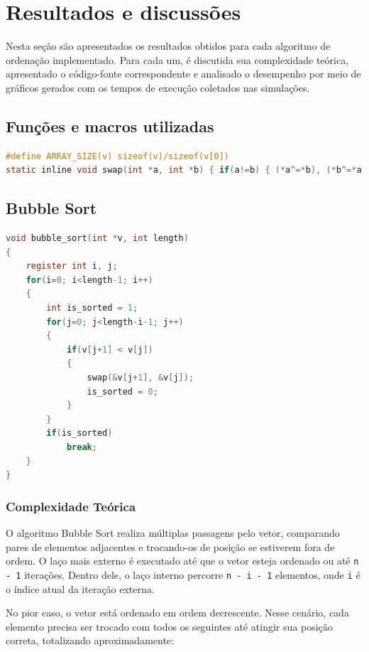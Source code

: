 \section{Resultados e discussões}
Nesta seção são apresentados os resultados obtidos para cada algoritmo de ordenação implementado. Para cada um, é discutida sua complexidade teórica, apresentado o código-fonte correspondente e analisado o desempenho por meio de gráficos gerados com os tempos de execução coletados nas simulações.

\newpage
\subsection{Funções e macros utilizadas}
\begin{lstlisting}[language=C, caption={Funções e macros}, label={lst:macros}]
#define ARRAY_SIZE(v) sizeof(v)/sizeof(v[0])
static inline void swap(int *a, int *b) { if(a!=b) { (*a^=*b), (*b^=*a), (*a^=*b); } }
\end{lstlisting}

\subsection{Bubble Sort}
\begin{lstlisting}[language=C, caption={Implementação do Bubble Sort em C com otimização}, label={lst:bubble}]
void bubble_sort(int *v, int length)
{
    register int i, j;
    for(i=0; i<length-1; i++)
    {
        int is_sorted = 1;
        for(j=0; j<length-i-1; j++)
        {
            if(v[j+1] < v[j])
            {
                swap(&v[j+1], &v[j]);
                is_sorted = 0;
            }
        }
        if(is_sorted)
            break;
    }
}
\end{lstlisting}

\subsubsection{Complexidade Teórica}

O algoritmo Bubble Sort realiza múltiplas passagens pelo vetor, comparando pares de elementos adjacentes e trocando-os de posição se estiverem fora de ordem. O laço mais externo é executado até que o vetor esteja ordenado ou até \texttt{n - 1} iterações. Dentro dele, o laço interno percorre \texttt{n - i - 1} elementos, onde \texttt{i} é o índice atual da iteração externa.

No pior caso, o vetor está ordenado em ordem decrescente. Nesse cenário, cada elemento precisa ser trocado com todos os seguintes até atingir sua posição correta, totalizando aproximadamente:

